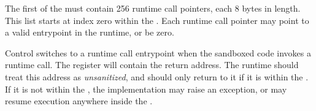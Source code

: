 

\specitem
The first  of the  must contain 256 runtime call pointers, each 8 bytes in length. This list starts at index zero within the . Each runtime call pointer may point to a valid entrypoint in the runtime, or be zero.

\specitem
Control switches to a runtime call entrypoint when the sandboxed code invokes a runtime call. The  register will contain the return address. The runtime should treat this address as \textit{unsanitized}, and should only return to it if it is within the . If it is not within the , the implementation may raise an exception, or may resume execution anywhere inside the .
